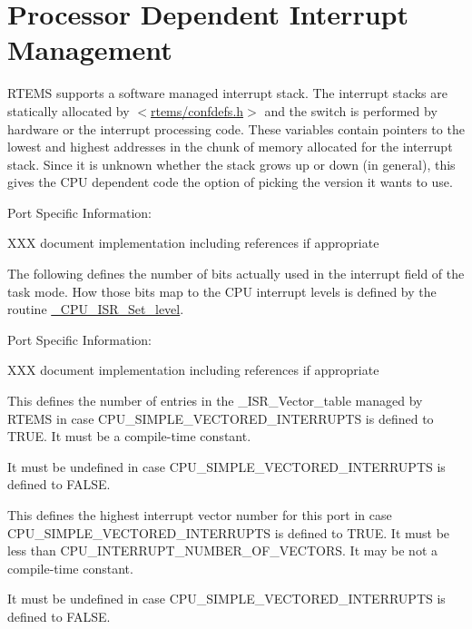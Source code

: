 \hypertarget{group__RTEMSScoreCPUExampleInterrupt}{}\section{Processor Dependent Interrupt Management}
\label{group__RTEMSScoreCPUExampleInterrupt}
R\+T\+E\+MS supports a software managed interrupt stack. The interrupt stacks are statically allocated by $<$\mbox{\hyperlink{confdefs_8h}{rtems/confdefs.\+h}}$>$ and the switch is performed by hardware or the interrupt processing code. These variables contain pointers to the lowest and highest addresses in the chunk of memory allocated for the interrupt stack. Since it is unknown whether the stack grows up or down (in general), this gives the C\+PU dependent code the option of picking the version it wants to use.

Port Specific Information\+:

X\+XX document implementation including references if appropriate

The following defines the number of bits actually used in the interrupt field of the task mode. How those bits map to the C\+PU interrupt levels is defined by the routine \mbox{\hyperlink{group__RTEMSScoreCPUARM_ga43820ba3d51d7a699c22fce8cac93ef1}{\+\_\+\+C\+P\+U\+\_\+\+I\+S\+R\+\_\+\+Set\+\_\+level}}.

Port Specific Information\+:

X\+XX document implementation including references if appropriate

This defines the number of entries in the \+\_\+\+I\+S\+R\+\_\+\+Vector\+\_\+table managed by R\+T\+E\+MS in case C\+P\+U\+\_\+\+S\+I\+M\+P\+L\+E\+\_\+\+V\+E\+C\+T\+O\+R\+E\+D\+\_\+\+I\+N\+T\+E\+R\+R\+U\+P\+TS is defined to T\+R\+UE. It must be a compile-\/time constant.

It must be undefined in case C\+P\+U\+\_\+\+S\+I\+M\+P\+L\+E\+\_\+\+V\+E\+C\+T\+O\+R\+E\+D\+\_\+\+I\+N\+T\+E\+R\+R\+U\+P\+TS is defined to F\+A\+L\+SE.

This defines the highest interrupt vector number for this port in case C\+P\+U\+\_\+\+S\+I\+M\+P\+L\+E\+\_\+\+V\+E\+C\+T\+O\+R\+E\+D\+\_\+\+I\+N\+T\+E\+R\+R\+U\+P\+TS is defined to T\+R\+UE. It must be less than C\+P\+U\+\_\+\+I\+N\+T\+E\+R\+R\+U\+P\+T\+\_\+\+N\+U\+M\+B\+E\+R\+\_\+\+O\+F\+\_\+\+V\+E\+C\+T\+O\+RS. It may be not a compile-\/time constant.

It must be undefined in case C\+P\+U\+\_\+\+S\+I\+M\+P\+L\+E\+\_\+\+V\+E\+C\+T\+O\+R\+E\+D\+\_\+\+I\+N\+T\+E\+R\+R\+U\+P\+TS is defined to F\+A\+L\+SE.

